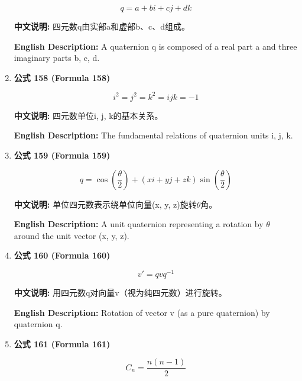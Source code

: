 \documentclass[12pt,a4paper]{article}
\begin{document}
\begin{enumerate}[leftmargin=*]
\begin{equation}
q = a + bi + cj + dk
\end{equation}

\textbf{中文说明:} 四元数q由实部a和虚部b、c、d组成。

\textbf{English Description:} A quaternion q is composed of a real part a and three imaginary parts b, c, d.

\vspace{0.5cm}

\item \textbf{公式 158 (Formula 158)}

\begin{equation}
i^2 = j^2 = k^2 = ijk = -1
\end{equation}

\textbf{中文说明:} 四元数单位i, j, k的基本关系。

\textbf{English Description:} The fundamental relations of quaternion units i, j, k.

\vspace{0.5cm}

\item \textbf{公式 159 (Formula 159)}

\begin{equation}
q = \cos\left(\frac{\theta}{2}\right) + (xi + yj + zk)\sin\left(\frac{\theta}{2}\right)
\end{equation}

\textbf{中文说明:} 单位四元数表示绕单位向量(x, y, z)旋转$\theta$角。

\textbf{English Description:} A unit quaternion representing a rotation by $\theta$ around the unit vector (x, y, z).

\vspace{0.5cm}

\item \textbf{公式 160 (Formula 160)}

\begin{equation}
v' = qvq^{-1}
\end{equation}

\textbf{中文说明:} 用四元数q对向量v（视为纯四元数）进行旋转。

\textbf{English Description:} Rotation of vector v (as a pure quaternion) by quaternion q.

\vspace{0.5cm}

\item \textbf{公式 161 (Formula 161)}

\begin{equation}
C_n = \frac{n(n-1)}{2}
\end{equation}


\end{enumerate}
\end{document}
